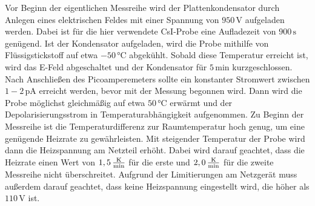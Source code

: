 Vor Beginn der eigentlichen Messreihe wird der Plattenkondensator durch Anlegen eines elektrischen Feldes mit einer Spannung von $950 \,\si{\volt}$ aufgeladen werden.
Dabei ist für die hier verwendete CsI-Probe eine Aufladezeit von $900 \,\si{\second}$ genügend.
Ist der Kondensator aufgeladen, wird die Probe mithilfe von Flüssigstickstoff auf etwa $-50 \,\si{\celsius}$ abgekühlt.
Sobald diese Temperatur erreicht ist, wird das E-Feld abgeschaltet und der Kondensator für $5 \,\si{\minute}$ kurzgeschlossen.
Nach Anschließen des Picoamperemeters sollte ein konstanter Stromwert zwischen $1-2 \,\si{\pico\ampere}$ erreicht werden, bevor mit der Messung begonnen wird.
Dann wird die Probe möglichst gleichmäßig auf etwa $50 \,\si{\celsius}$ erwärmt und der Depolarisierungsstrom in Temperaturabhängigkeit aufgenommen.
Zu Beginn der Messreihe ist die Temperaturdifferenz zur Raumtemperatur hoch genug, um eine genügende Heizrate zu gewährleisten.
Mit steigender Temperatur der Probe wird dann die Heizspannung am Netzteil erhöht.
Dabei wird darauf geachtet, dass die Heizrate einen Wert von $1,5 \, \unit{\frac{\kelvin}{\minute}}$ für die erste und $2,0 \, \unit{\frac{\kelvin}{\minute}}$ für die zweite Messreihe nicht überschreitet. 
Aufgrund der Limitierungen am Netzgerät muss außerdem darauf geachtet, dass keine Heizspannung eingestellt wird, die höher als $110 \,\si{\volt}$ ist. 
